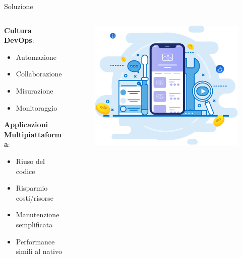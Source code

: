 \begin{frame}{Soluzione}
    \begin{columns}[onlytextwidth,t]
        \begin{column}{0.45\textwidth}
    
            \textbf{Cultura DevOps}:
            \begin{itemize}
                \item Automazione
                \item Collaborazione
                \item Misurazione
                \item Monitoraggio
            \end{itemize}

            \vspace{4mm}
        
            \textbf{Applicazioni\\Multipiattaforma}:
            \begin{itemize}
                \item Riuso del codice
                \item Risparmio costi/risorse
                \item Manutenzione semplificata
                \item Performance simili al nativo
            \end{itemize}
            
        \end{column}
        \begin{column}{0.55\textwidth}

            \begin{figure}[H]
                \includegraphics[width=1\textwidth]{img/devops-mobile.png}
            \end{figure}
        
        \end{column}
    \end{columns}
\end{frame}